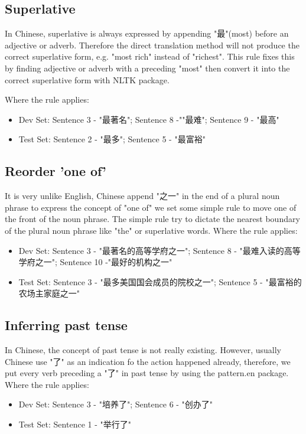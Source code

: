 \documentclass[11pt]{article} %
\begin{document}
\begin{CJK}{UTF8}{gbsn}
\subsection{Superlative}
In Chinese, superlative is always expressed by appending "最"(most) before an adjective or adverb. Therefore the direct translation method will not produce the correct superlative form, e.g. "most rich" instead of "richest". This rule fixes this by finding adjective or adverb with a preceding "most" then convert it into the correct superlative form with NLTK package.

Where the rule applies:
\begin{itemize}
\item Dev Set: Sentence 3 - "最著名"; Sentence 8 -""最难"; Sentence 9 - "最高"
\item Test Set: Sentence 2 - "最多"; Sentence 5 - "最富裕"
\end{itemize}

\subsection{Reorder 'one of'}
It is very unlike English, Chinese append "之一" in the end of a plural noun phrase to express the concept of "one of" we set some simple rule to move one of the front of the noun phrase. The simple rule try to dictate the nearest boundary of the plural noun phrase like "the" or superlative words.
Where the rule applies:
\begin{itemize}
\item Dev Set: Sentence 3 - "最著名的高等学府之一"; Sentence 8 - "最难入读的高等学府之一"; Sentence 10 -"最好的机构之一"
\item Test Set: Sentence 3 - "最多美国国会成员的院校之一"; Sentence 5 - "最富裕的农场主家庭之一"
\end{itemize}

\subsection{Inferring past tense}
In Chinese, the concept of past tense is not really existing. However, usually Chinese use "了" as an indication fo the action happened already, therefore, we put every verb preceding a "了" in past tense by using the pattern.en package.
Where the rule applies:
\begin{itemize}
\item Dev Set: Sentence 3 - "培养了"; Sentence 6 - "创办了"
\item Test Set: Sentence 1 - "举行了"
\end{itemize}


\end{CJK}
\end{document}
